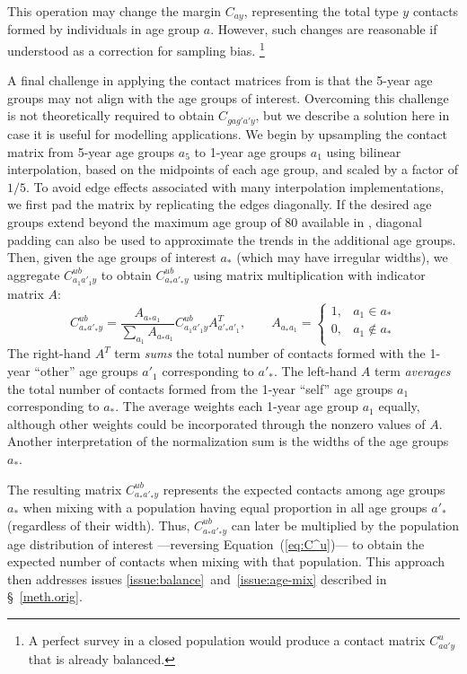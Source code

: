 This operation may change the margin $C_{ay}$, representing
the total type $y$ contacts formed by individuals in age group $a$.
However, such changes are reasonable if understood as a correction for sampling bias.%
\footnote{A perfect survey in a closed population would produce
  a contact matrix $C^u_{aa'y}$ that is already balanced.}
\par
A final challenge in applying the contact matrices from \cite{Prem2017} is that
the 5-year age groups may not align with the age groups of interest.
Overcoming this challenge is not theoretically required to obtain $C_{gag'a'y}$,
but we describe a solution here in case it is useful for modelling applications.
We begin by upsampling the contact matrix from 5-year age groups $a_5$ to 1-year age groups $a_1$
using bilinear interpolation, based on the midpoints of each age group,
and scaled by a factor of $1/5$.
To avoid edge effects associated with many interpolation implementations,
we first pad the matrix by replicating the edges diagonally.
If the desired age groups extend beyond the maximum age group of 80 available in \cite{Arenas2020},
diagonal padding can also be used to approximate the trends in the additional age groups.
Then, given the age groups of interest $a_*$ (which may have irregular widths),
we aggregate $C^{ub}_{a_1a'_1y}$ to obtain $C^{ub}_{a_*a'_*y}$
using matrix multiplication with indicator matrix $A$:
\begin{equation}\label{eq:Ca*}
  C^{ub}_{a_*a'_*y} = \frac{A_{a_*a_1}}{\sum_{a_1} A_{a_*a_1}} C^{ub}_{a_1a'_1y} A_{a'_*a'_1}^T,\qquad
  A_{a_*a_1} = \begin{cases}
    1, & a_1 \in a_* \\
    0, & a_1 \not\in a_* \\
  \end{cases}
\end{equation}
The right-hand $A^T$ term \textit{sums} the total number of contacts
formed with the 1-year ``other'' age groups $a'_1$ corresponding to $a'_*$.
The left-hand $A$ term \textit{averages} the total number of contacts
formed from the 1-year ``self'' age groups $a_1$ corresponding to $a_*$.
The average weights each 1-year age group $a_1$ equally,
although other weights could be incorporated through the nonzero values of $A$.
Another interpretation of the normalization sum is the widths of the age groups $a_*$.
\par
The resulting matrix $C^{ub}_{a_*a'_*y}$ represents the expected contacts among age groups $a_*$
when mixing with a population having equal proportion in all age groups $a'_*$ (regardless of their width).
Thus, $C^{ub}_{a_*a'_*y}$ can later be multiplied by the population age distribution of interest%
---reversing Equation~(\ref{eq:C^u})---%
to obtain the expected number of contacts when mixing with that population.
This approach then addresses issues \ref{issue:balance}~and~\ref{issue:age-mix}
described in \S~\ref{meth.orig}.

